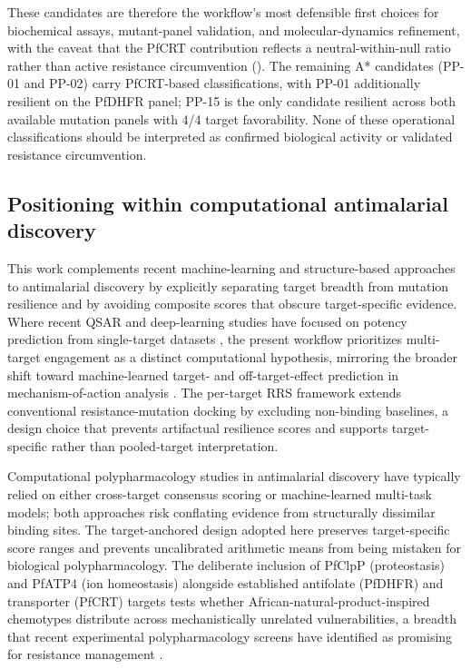 \documentclass[journal=jcisd8,manuscript=article]{achemso}
\begin{document}
These candidates are therefore the workflow's most defensible first choices for biochemical assays, mutant-panel validation, and molecular-dynamics refinement, with the caveat that the PfCRT contribution reflects a neutral-within-null ratio rather than active resistance circumvention (). The remaining A* candidates (PP-01 and PP-02) carry PfCRT-based classifications, with PP-01 additionally resilient on the PfDHFR panel; PP-15 is the only candidate resilient across both available mutation panels with 4/4 target favorability. None of these operational classifications should be interpreted as confirmed biological activity or validated resistance circumvention.

\subsection{Positioning within computational antimalarial discovery}\label{sec:disc_positioning}
This work complements recent machine-learning and structure-based approaches to antimalarial discovery by explicitly separating target breadth from mutation resilience and by avoiding composite scores that obscure target-specific evidence. Where recent QSAR and deep-learning studies have focused on potency prediction from single-target datasets \cite{Wells2015,SiqueiraNeto2023,Sentinel2025Offtarget}, the present workflow prioritizes multi-target engagement as a distinct computational hypothesis, mirroring the broader shift toward machine-learned target- and off-target-effect prediction in mechanism-of-action analysis \cite{Trapotsi2022MoA}. The per-target RRS framework extends conventional resistance-mutation docking by excluding non-binding baselines, a design choice that prevents artifactual resilience scores and supports target-specific rather than pooled-target interpretation.

Computational polypharmacology studies in antimalarial discovery have typically relied on either cross-target consensus scoring or machine-learned multi-task models; both approaches risk conflating evidence from structurally dissimilar binding sites. The target-anchored design adopted here preserves target-specific score ranges and prevents uncalibrated arithmetic means from being mistaken for biological polypharmacology. The deliberate inclusion of PfClpP (proteostasis) and PfATP4 (ion homeostasis) alongside established antifolate (PfDHFR) and transporter (PfCRT) targets tests whether African-natural-product-inspired chemotypes distribute across mechanistically unrelated vulnerabilities, a breadth that recent experimental polypharmacology screens have identified as promising for resistance management \cite{Wells2015,SiqueiraNeto2023,Blake2025Resistome}.
\end{document}
